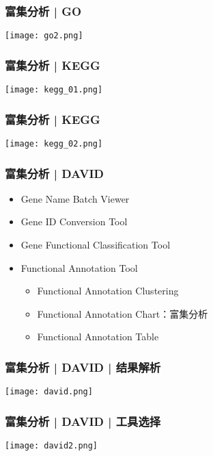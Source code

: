 \begin{frame}
  \frametitle{富集分析 | GO}
    \begin{center}
      \texttt{[image: go2.png]}
    \end{center}
\end{frame}

\begin{frame}
  \frametitle{富集分析 | KEGG}
    \begin{center}
      \texttt{[image: kegg\_01.png]}
    \end{center}
\end{frame}

\begin{frame}
  \frametitle{富集分析 | KEGG}
    \begin{center}
      \texttt{[image: kegg\_02.png]}
    \end{center}
\end{frame}

\begin{frame}
  \frametitle{富集分析 | DAVID}
  \begin{itemize}
    \item Gene Name Batch Viewer
    \item Gene ID Conversion Tool
    \item Gene Functional Classification Tool
    \item Functional Annotation Tool
    \begin{itemize}
      \item Functional Annotation Clustering
      \item \alert{Functional Annotation Chart}：富集分析
      \item Functional Annotation Table
    \end{itemize}
  \end{itemize}
\end{frame}

\begin{frame}
  \frametitle{富集分析 | DAVID | \alert{结果解析}}
  \begin{center}
    \texttt{[image: david.png]}
  \end{center}
\end{frame}

\begin{frame}
  \frametitle{富集分析 | DAVID | 工具选择}
  \begin{center}
    \texttt{[image: david2.png]}
  \end{center}
\end{frame}

